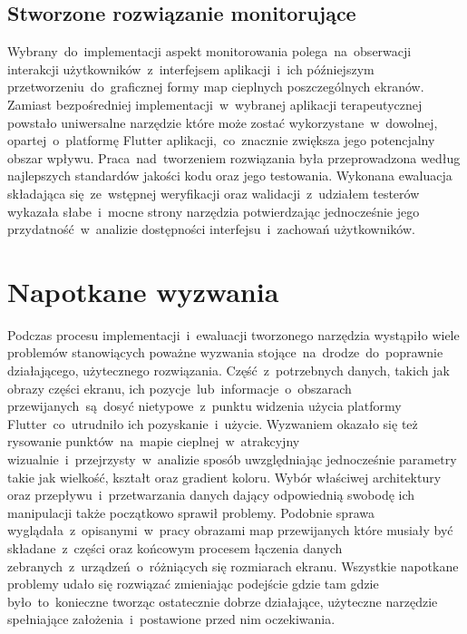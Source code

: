 \subsection{Stworzone rozwiązanie monitorujące}
Wybrany~do~implementacji aspekt monitorowania polega~na~obserwacji interakcji użytkowników~z~interfejsem aplikacji~i~ich późniejszym przetworzeniu~do~graficznej formy map cieplnych poszczególnych ekranów. Zamiast bezpośredniej implementacji~w~wybranej aplikacji terapeutycznej powstało uniwersalne narzędzie które może zostać wykorzystane~w~dowolnej, opartej~o~platformę Flutter aplikacji,~co~znacznie zwiększa jego potencjalny obszar wpływu. Praca~nad~tworzeniem rozwiązania była przeprowadzona według najlepszych standardów jakości kodu oraz jego testowania. Wykonana ewaluacja składająca się~ze~wstępnej weryfikacji oraz walidacji~z~udziałem testerów wykazała słabe~i~mocne strony narzędzia potwierdzając jednocześnie jego przydatność~w~analizie dostępności interfejsu~i~zachowań użytkowników. 
	
\section{Napotkane wyzwania}
Podczas procesu implementacji~i~ewaluacji tworzonego narzędzia wystąpiło wiele problemów stanowiących poważne wyzwania stojące~na~drodze~do~poprawnie działającego, użytecznego rozwiązania. Część~z~potrzebnych danych, takich jak obrazy części ekranu, ich pozycje~lub~informacje~o~obszarach przewijanych~są~dosyć nietypowe~z~punktu widzenia użycia platformy Flutter~co~utrudniło ich pozyskanie~i~użycie. Wyzwaniem okazało się też rysowanie punktów~na~mapie cieplnej~w~atrakcyjny wizualnie~i~przejrzysty~w~analizie sposób uwzględniając jednocześnie parametry takie jak wielkość, kształt oraz gradient koloru. Wybór właściwej architektury oraz przepływu~i~przetwarzania danych dający odpowiednią swobodę ich manipulacji także początkowo sprawił problemy. Podobnie sprawa wyglądała~z~opisanymi~w~pracy obrazami map przewijanych które musiały być składane~z~części oraz końcowym procesem łączenia danych zebranych~z~urządzeń~o~różniących się rozmiarach ekranu. Wszystkie napotkane problemy udało się rozwiązać zmieniając podejście gdzie tam gdzie było~to~konieczne tworząc ostatecznie dobrze działające, użyteczne narzędzie spełniające założenia~i~postawione przed nim oczekiwania.
